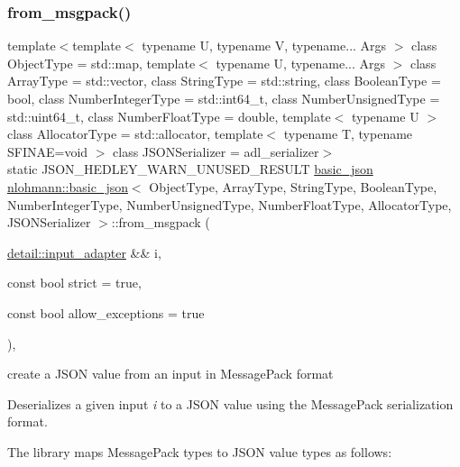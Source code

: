 \subsubsection{\texorpdfstring{from\+\_\+msgpack()}{from\_msgpack()}\hspace{0.1cm}{\footnotesize\ttfamily [1/2]}}
{\footnotesize\ttfamily template$<$template$<$ typename U, typename V, typename... Args $>$ class Object\+Type = std\+::map, template$<$ typename U, typename... Args $>$ class Array\+Type = std\+::vector, class String\+Type  = std\+::string, class Boolean\+Type  = bool, class Number\+Integer\+Type  = std\+::int64\+\_\+t, class Number\+Unsigned\+Type  = std\+::uint64\+\_\+t, class Number\+Float\+Type  = double, template$<$ typename U $>$ class Allocator\+Type = std\+::allocator, template$<$ typename T, typename S\+F\+I\+N\+A\+E=void $>$ class J\+S\+O\+N\+Serializer = adl\+\_\+serializer$>$ \\
static J\+S\+O\+N\+\_\+\+H\+E\+D\+L\+E\+Y\+\_\+\+W\+A\+R\+N\+\_\+\+U\+N\+U\+S\+E\+D\+\_\+\+R\+E\+S\+U\+LT \mbox{\hyperlink{classnlohmann_1_1basic__json}{basic\+\_\+json}} \mbox{\hyperlink{classnlohmann_1_1basic__json}{nlohmann\+::basic\+\_\+json}}$<$ Object\+Type, Array\+Type, String\+Type, Boolean\+Type, Number\+Integer\+Type, Number\+Unsigned\+Type, Number\+Float\+Type, Allocator\+Type, J\+S\+O\+N\+Serializer $>$\+::from\+\_\+msgpack (\begin{DoxyParamCaption}\item[{\mbox{\hyperlink{classnlohmann_1_1detail_1_1input__adapter}{detail\+::input\+\_\+adapter}} \&\&}]{i,  }\item[{const bool}]{strict = {\ttfamily true},  }\item[{const bool}]{allow\+\_\+exceptions = {\ttfamily true} }\end{DoxyParamCaption})\hspace{0.3cm}{\ttfamily [inline]}, {\ttfamily [static]}}



create a J\+S\+ON value from an input in Message\+Pack format 

Deserializes a given input {\itshape i} to a J\+S\+ON value using the Message\+Pack serialization format.

The library maps Message\+Pack types to J\+S\+ON value types as follows\+:

